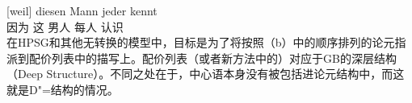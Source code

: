 \ex 
\gll {}[weil] diesen Mann jeder kennt\\
	 {}\spacebr{}因为 这 男人 每人 认识\\
\zl
在HPSG和其他无转换的模型中，目标是为了将按照（b）中的顺序排列的论元指派到配价列表中的描写上。配价列表（或者新方法中的\argstc）对应于GB的深层结构（Deep Structure）。不同之处在于，中心语本身没有被包括进论元结构中，而这就是D"=结构的情况。


